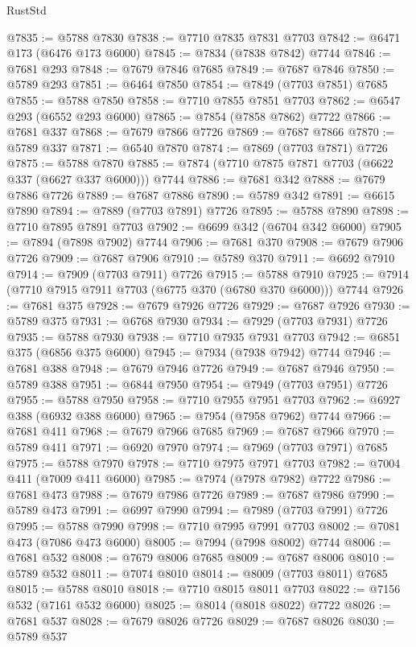 \begin{lexlean}{RustStd}
\begin{coremodule}
@7835 := @5788 @7830
@7838 := @7710 @7835 @7831 @7703
@7842 := @6471 @173 (@6476 @173 @6000)
@7845 := @7834 (@7838 @7842) @7744
@7846 := @7681 @293
@7848 := @7679 @7846 @7685
@7849 := @7687 @7846
@7850 := @5789 @293
@7851 := @6464 @7850
@7854 := @7849 (@7703 @7851) @7685
@7855 := @5788 @7850
@7858 := @7710 @7855 @7851 @7703
@7862 := @6547 @293 (@6552 @293 @6000)
@7865 := @7854 (@7858 @7862) @7722
@7866 := @7681 @337
@7868 := @7679 @7866 @7726
@7869 := @7687 @7866
@7870 := @5789 @337
@7871 := @6540 @7870
@7874 := @7869 (@7703 @7871) @7726
@7875 := @5788 @7870
@7885 := @7874 (@7710 @7875 @7871 @7703 (@6622 @337 (@6627 @337 @6000))) @7744
@7886 := @7681 @342
@7888 := @7679 @7886 @7726
@7889 := @7687 @7886
@7890 := @5789 @342
@7891 := @6615 @7890
@7894 := @7889 (@7703 @7891) @7726
@7895 := @5788 @7890
@7898 := @7710 @7895 @7891 @7703
@7902 := @6699 @342 (@6704 @342 @6000)
@7905 := @7894 (@7898 @7902) @7744
@7906 := @7681 @370
@7908 := @7679 @7906 @7726
@7909 := @7687 @7906
@7910 := @5789 @370
@7911 := @6692 @7910
@7914 := @7909 (@7703 @7911) @7726
@7915 := @5788 @7910
@7925 := @7914 (@7710 @7915 @7911 @7703 (@6775 @370 (@6780 @370 @6000))) @7744
@7926 := @7681 @375
@7928 := @7679 @7926 @7726
@7929 := @7687 @7926
@7930 := @5789 @375
@7931 := @6768 @7930
@7934 := @7929 (@7703 @7931) @7726
@7935 := @5788 @7930
@7938 := @7710 @7935 @7931 @7703
@7942 := @6851 @375 (@6856 @375 @6000)
@7945 := @7934 (@7938 @7942) @7744
@7946 := @7681 @388
@7948 := @7679 @7946 @7726
@7949 := @7687 @7946
@7950 := @5789 @388
@7951 := @6844 @7950
@7954 := @7949 (@7703 @7951) @7726
@7955 := @5788 @7950
@7958 := @7710 @7955 @7951 @7703
@7962 := @6927 @388 (@6932 @388 @6000)
@7965 := @7954 (@7958 @7962) @7744
@7966 := @7681 @411
@7968 := @7679 @7966 @7685
@7969 := @7687 @7966
@7970 := @5789 @411
@7971 := @6920 @7970
@7974 := @7969 (@7703 @7971) @7685
@7975 := @5788 @7970
@7978 := @7710 @7975 @7971 @7703
@7982 := @7004 @411 (@7009 @411 @6000)
@7985 := @7974 (@7978 @7982) @7722
@7986 := @7681 @473
@7988 := @7679 @7986 @7726
@7989 := @7687 @7986
@7990 := @5789 @473
@7991 := @6997 @7990
@7994 := @7989 (@7703 @7991) @7726
@7995 := @5788 @7990
@7998 := @7710 @7995 @7991 @7703
@8002 := @7081 @473 (@7086 @473 @6000)
@8005 := @7994 (@7998 @8002) @7744
@8006 := @7681 @532
@8008 := @7679 @8006 @7685
@8009 := @7687 @8006
@8010 := @5789 @532
@8011 := @7074 @8010
@8014 := @8009 (@7703 @8011) @7685
@8015 := @5788 @8010
@8018 := @7710 @8015 @8011 @7703
@8022 := @7156 @532 (@7161 @532 @6000)
@8025 := @8014 (@8018 @8022) @7722
@8026 := @7681 @537
@8028 := @7679 @8026 @7726
@8029 := @7687 @8026
@8030 := @5789 @537

\end{coremodule}
\end{lexlean}
